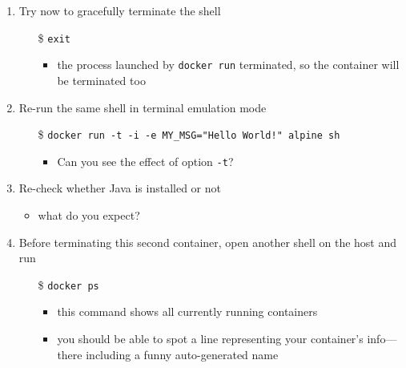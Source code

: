 \documentclass[presentation]{beamer}\mode<presentation>{\usetheme{AMSBolognaFC}}
\begin{document}
\begin{frame}[allowframebreaks]
\begin{enumerate}
        \framebreak

        \item Try now to gracefully terminate the shell
        \begin{itemize}
            \item[\$] \texttt{exit}
            \begin{itemize}
                \item the process launched by \texttt{docker run} terminated, so the container will be terminated too
            \end{itemize}
        \end{itemize}

        \item Re-run the same shell in terminal emulation mode
        \begin{itemize}
            \item[\$] \texttt{docker run \alert{-t} -i -e MY\_MSG="Hello World!" alpine sh}
            \begin{itemize}
                \item Can you see the effect of option \texttt{-t}?
            \end{itemize}
        \end{itemize}

        \item Re-check whether Java is installed or not
        \begin{itemize}
            \item what do you expect?
        \end{itemize}

        \framebreak

        \item \alert{Before terminating this second container}, open another shell \alert{on the host} and run
        \begin{itemize}
            \item[\$] \texttt{docker \alert{ps}}
            \begin{itemize}
                \item this command shows all \alert{currently} running containers
                \item you should be able to spot a line representing your container's info---there including a funny auto-generated name
            \end{itemize}
        \end{itemize}


\end{enumerate}
\end{frame}
\end{document}
